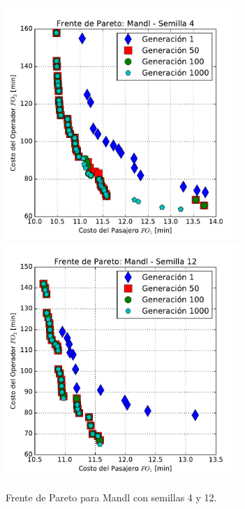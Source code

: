 \newpage

\begin{figure}[p]
\centering
\includegraphics[width=0.79\textwidth]{img/frente_Mandl_s4}
\includegraphics[width=0.79\textwidth]{img/frente_Mandl_s12}
\caption{Frente de Pareto para Mandl con semillas 4 y 12.}
\label{fig:paretoMandl1}
\end{figure}

